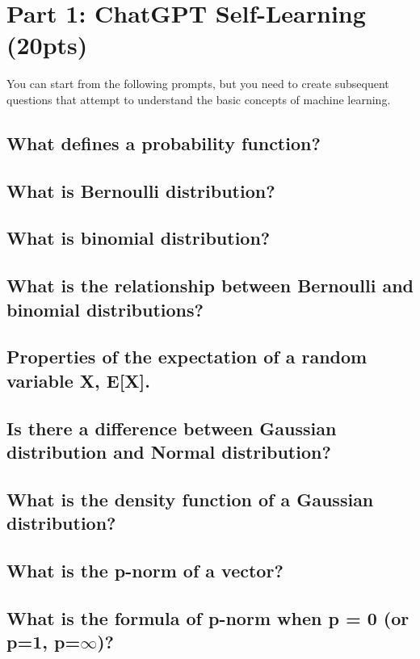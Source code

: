 \section{Part 1: ChatGPT Self-Learning (20pts)}

You can start from the following prompts, but you need to create subsequent questions that attempt to understand the basic concepts of machine learning.

\subsection{What defines a probability function?}

\subsection{What is Bernoulli distribution?}

\subsection{What is binomial distribution?}

\subsection{What is the relationship between Bernoulli and binomial distributions?}

\subsection{Properties of the expectation of a random variable X, E[X].}

\subsection{Is there a difference between Gaussian distribution and Normal distribution?}

\subsection{What is the density function of a Gaussian distribution?}

\subsection{What is the p-norm of a vector?}

\subsection{What is the formula of p-norm when p = 0 (or p=1, p=$\infty$)?}


